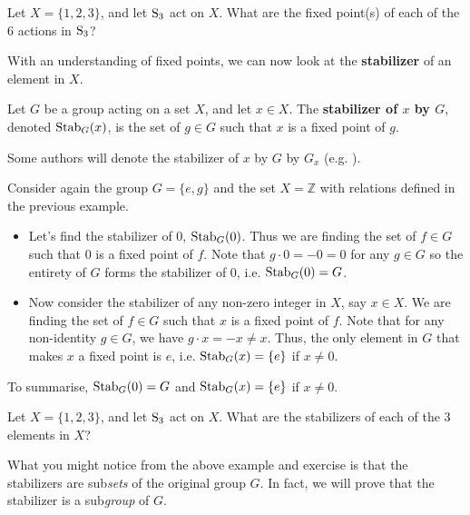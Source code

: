 \begin{exercise}
    Let $X = \{1, 2, 3\}$, and let $\mathrm{S}_{3}$ act on $X$. What are the fixed point(s) of each of the 6 actions in $\mathrm{S}_{3}$?
\end{exercise}

With an understanding of fixed points, we can now look at the \textbf{stabilizer} of an element in $X$.

\begin{definition}
    Let $G$ be a group acting on a set $X$, and let $x \in X$. The \textbf{stabilizer of $x$ by $G$}, denoted $\mathrm{Stab}_{G}(x)$, is the set of $g \in G$ such that $x$ is a fixed point of $g$.
\end{definition}
\begin{remark}
    Some authors will denote the stabilizer of $x$ by $G$ by $G_x$ (e.g. \cite{clark_1984, humphreys_1996, brilliant_groupactions}).
\end{remark}

\begin{example}
    Consider again the group $G = \{e, g\}$ and the set $X = \mathbb{Z}$ with relations defined in the previous example.
    \begin{itemize}
        \item Let's find the stabilizer of 0, $\mathrm{Stab}_{G}(0)$. Thus we are finding the set of $f \in G$ such that 0 is a fixed point of $f$. Note that $g \cdot 0 = -0 = 0$ for any $g \in G$ so the entirety of $G$ forms the stabilizer of 0, i.e. $\mathrm{Stab}_{G}(0) = G$.
        \item Now consider the stabilizer of any non-zero integer in $X$, say $x \in X$. We are finding the set of $f \in G$ such that $x$ is a fixed point of $f$. Note that for any non-identity $g \in G$, we have $g \cdot x = -x \neq x$. Thus, the only element in $G$ that makes $x$ a fixed point is $e$, i.e. $\mathrm{Stab}_{G}(x) = \{e\}$ if $x \neq 0$.
    \end{itemize}
    To summarise, $\mathrm{Stab}_{G}(0) = G$ and $\mathrm{Stab}_{G}(x) = \{e\}$ if $x \neq 0$.
\end{example}

\begin{exercise}
    Let $X = \{1, 2, 3\}$, and let $\mathrm{S}_{3}$ act on $X$. What are the stabilizers of each of the 3 elements in $X$?
\end{exercise}

What you might notice from the above example and exercise is that the stabilizers are sub\textit{sets} of the original group $G$. In fact, we will prove that the stabilizer is a sub\textit{group} of $G$.

